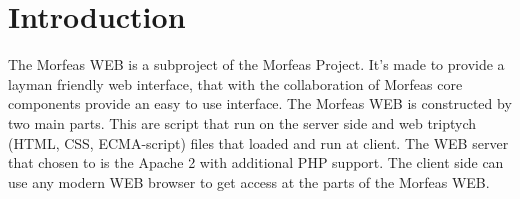 \section{Introduction}
The Morfeas WEB is a subproject of the Morfeas Project. It's made to provide a layman friendly web interface, that with the collaboration of Morfeas core components provide
an easy to use interface. The Morfeas WEB is constructed by two main parts. This are script that run on the server side and web triptych (HTML, CSS, ECMA-script) files that
loaded and run at client. The WEB server that chosen to is the Apache 2 with additional PHP support. The client side can use any modern WEB browser to get access at the parts
of the Morfeas WEB.